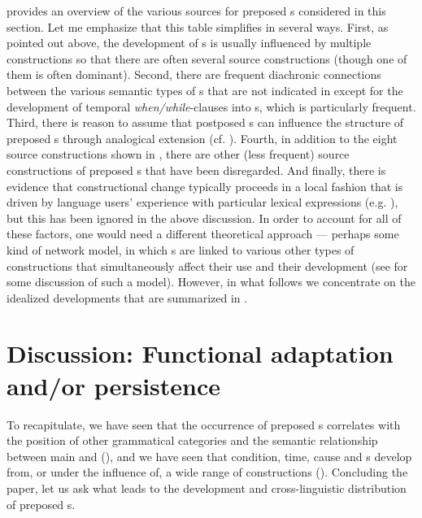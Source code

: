 \documentclass[output=paper]{langsci/langscibook}
\begin{document}
 provides an overview of the various sources for preposed s considered in this section. Let me emphasize that this table simplifies in several ways. First, as pointed out above, the development of s is usually influenced by multiple constructions so that there are often several source constructions (though one of them is often dominant). Second, there are frequent diachronic connections between the various semantic types of s that are not indicated in  except for the development of temporal \textit{when/while}-clauses into s, which is particularly frequent. Third, there is reason to assume that postposed s can influence the structure of preposed s through analogical extension (cf. \citealt{Traugott1985}). Fourth, in addition to the eight source constructions shown in , there are other (less frequent) source constructions of preposed s that have been disregarded. And finally, there is evidence that constructional change typically proceeds in a local fashion that is driven by language users’ experience with particular lexical expressions (e.g. \citealt{Givón1991}), but this has been ignored in the above discussion. In order to account for all of these factors, one would need a different theoretical approach — perhaps some kind of network model, in which s are linked to various other types of constructions that simultaneously affect their use and their development (see \citealt{Diessel2015} for some discussion of such a model). However, in what follows we concentrate on the idealized developments that are summarized in .

\section{Discussion: Functional adaptation and/or persistence}
\label{sec:diessel:4}

To recapitulate, we have seen that the occurrence of preposed s correlates with the position of other grammatical categories and the semantic relationship between main and  (), and we have seen that condition, time, cause and s develop from, or under the influence of, a wide range of constructions (). Concluding the paper, let us ask what leads to the development and cross-linguistic distribution of preposed s.
\end{document}
